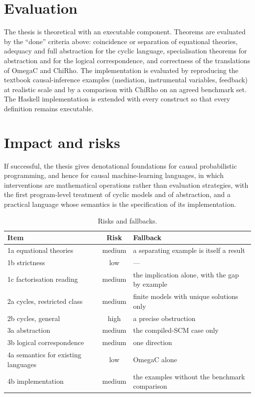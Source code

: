 \section{Evaluation}

The thesis is theoretical with an executable component. Theorems are evaluated by the ``done'' criteria above: coincidence or separation of equational theories, adequacy and full abstraction for the cyclic language, specialisation theorems for abstraction and for the logical correspondence, and correctness of the translations of OmegaC and ChiRho. The implementation is evaluated by reproducing the textbook causal-inference examples (mediation, instrumental variables, feedback) at realistic scale and by a comparison with ChiRho on an agreed benchmark set. The Haskell implementation \cite{ARTIFACT_wang_2026_23207221} is extended with every construct so that every definition remains executable.

\section{Impact and risks}

If successful, the thesis gives denotational foundations for causal probabilistic programming, and hence for causal machine-learning languages, in which interventions are mathematical operations rather than evaluation strategies, with the first program-level treatment of cyclic models and of abstraction, and a practical language whose semantics is the specification of its implementation.

\begin{table}[ht]
\centering\small
\begin{tabularx}{\textwidth}{lcX}
\toprule
Item & Risk & Fallback\\
\midrule
1a equational theories & medium & a separating example is itself a result\\
1b strictness & low & ---\\
1c factorisation reading & medium & the implication alone, with the gap by example\\
2a cycles, restricted class & medium & finite models with unique solutions only\\
2b cycles, general & high & a precise obstruction\\
3a abstraction & medium & the compiled-SCM case only\\
3b logical correspondence & medium & one direction\\
4a semantics for existing languages & low & OmegaC alone\\
4b implementation & medium & the examples without the benchmark comparison\\
\bottomrule
\end{tabularx}
\caption{Risks and fallbacks.}
\end{table}

